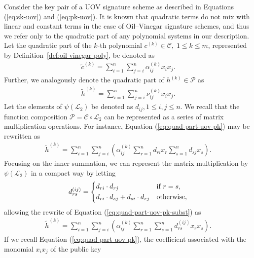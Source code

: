 \documentclass[english]{ufsc-thesis-rn46-2019/ufsc-thesis-rn46-2019}
\theoremstyle{definition}
\begin{document}
Consider the key pair of a UOV signature scheme as described in Equations
(\ref{eq:sk-uov}) and (\ref{eq:pk-uov}). It is known that quadratic terms do
not mix with linear and constant terms in the case of Oil--Vinegar signature
schemes, and thus we refer only to the quadratic part of any polynomial systems
in our description. Let the quadratic part of the $k$-th polynomial $c^{(k)}
\in \mathcal{C},\; 1 \leq k \leq m$, represented by
Definition~\ref{def:oil-vinegar-poly}, be denoted as
\begin{align}
  \widetilde{c}^{(k)}
    = \sum_{i = 1}^{n} \sum_{j = i}^{n} \alpha_{ij}^{(k)} x_{i} x_{j}.
\end{align}
Further, we analogously denote the quadratic part of $h^{(k)} \in \mathcal{P}$
as
\begin{align}\label{eq:quad-part-uov-pk}
  \widetilde{h}^{(k)}
    = \sum_{i = 1}^{n} \sum_{j = i}^{n} \nu_{ij}^{(k)} x_{i} x_{j}.
\end{align}
Let the elements of $\psi(\mathcal{L}_{2})$ be denoted as
$d_{ij}, 1 \leq i, j \leq n$. We recall that the function composition
$\mathcal{P} = \mathcal{C} \circ \mathcal{L}_{2}$ can be represented as
a series of matrix multiplication operations. For instance, Equation
(\ref{eq:quad-part-uov-pk}) may be rewritten as
\begin{align}\label{eq:quad-part-uov-pk-subst}
  \widetilde{h}^{(k)} = \sum_{i = 1}^{n} \sum_{j = i}^{n} \left(
    \alpha_{ij}^{(k)} \sum_{r = 1}^{n} d_{ri} x_{r}
    \sum_{s = 1}^{n} d_{sj} x_{s}
  \right).
\end{align}
Focusing on the inner summation, we can represent the matrix multiplication
by $\psi(\mathcal{L}_{2})$ in a compact way by letting
\begin{align}
  d_{rs}^{(ij)} =
  \begin{dcases}
    d_{ri} \cdot d_{rj}                       & \text{if } r = s, \\
    d_{ri} \cdot d_{sj} + d_{si} \cdot d_{rj} & \text{otherwise},
  \end{dcases}
\end{align}
allowing the rewrite of Equation (\ref{eq:quad-part-uov-pk-subst}) as
\begin{align}
  \widetilde{h}^{(k)}
    = \sum_{i = 1}^{n} \sum_{j = i}^{n} \left(
      \alpha_{ij}^{(k)} \sum_{r = 1}^{n}
      \sum_{s = 1}^{n} d_{rs}^{(ij)} x_{r} x_{s}
    \right).
\end{align}
If we recall Equation (\ref{eq:quad-part-uov-pk}), the coefficient
associated with the monomial $x_{i} x_{j}$ of the public key
\end{document}
